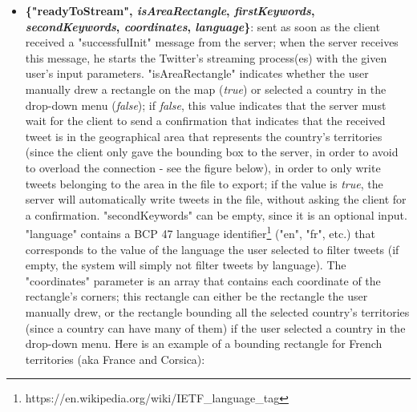 \documentclass[a4paper,11pt]{report}
\begin{document}
\begin{itemize}
	\item \textbf{\{"readyToStream", \textit{isAreaRectangle}, \textit{firstKeywords}, \textit{secondKeywords}, \textit{coordinates}, \textit{language}\}}: sent as soon as the client received a "successfulInit" message from the server; when the server receives this message, he starts the Twitter's streaming process(es) with the given user's input parameters. "isAreaRectangle" indicates whether the user manually drew a rectangle on the map (\emph{true}) or selected a country in the drop-down menu (\emph{false}); if \emph{false}, this value indicates that the server must wait for the client to send a confirmation that indicates that the received tweet is in the geographical area that represents the country's territories (since the client only gave the bounding box to the server, in order to avoid to overload the connection - see the figure below), in order to only write tweets belonging to the area in the file to export; if the value is \emph{true}, the server will automatically write tweets in the file, without asking the client for a confirmation. "secondKeywords" can be empty, since it is an optional input. "language" contains a BCP 47 language identifier\footnote{https://en.wikipedia.org/wiki/IETF\_language\_tag} ("en", "fr", etc.) that corresponds to the value of the language the user selected to filter tweets (if empty, the system will simply not filter tweets by language).	The "coordinates" parameter is an array that contains each coordinate of the rectangle's corners; this rectangle can either be the rectangle the user manually drew, or the rectangle bounding all the selected country's territories (since a country can have many of them) if the user selected a country in the drop-down menu. Here is an example of a bounding rectangle for French territories (aka France and Corsica):
	\begin{figure}[H]
	\vspace{-5pt}
	\begin{center}

\end{center}
\end{figure}
\end{itemize}
\end{document}
